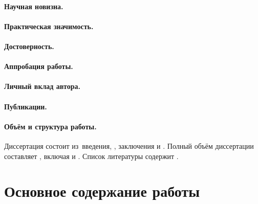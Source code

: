 \paragraph*{Научная новизна.}
\paragraph*{Практическая значимость.}
\paragraph*{Достоверность.}
\paragraph*{Аппробация работы.}
\paragraph*{Личный вклад автора.}
\paragraph*{Публикации.}
\paragraph*{Объём и структура работы.}
Диссертация состоит из~введения,
,
заключения и
.
%
Полный объём диссертации составляет
, включая
 и
.
Список литературы содержит
.


\newpage
\section*{Основное содержание работы}




